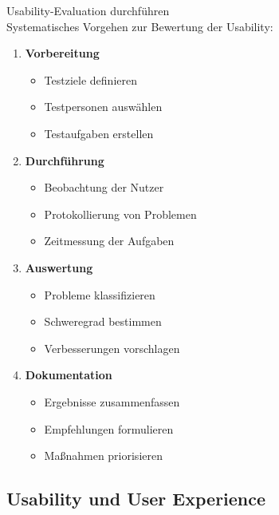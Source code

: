 \begin{KR}{Usability-Evaluation durchführen}\\
Systematisches Vorgehen zur Bewertung der Usability:

\begin{enumerate}
    \item \textbf{Vorbereitung}
    \begin{itemize}
        \item Testziele definieren
        \item Testpersonen auswählen
        \item Testaufgaben erstellen
    \end{itemize}
    
    \item \textbf{Durchführung}
    \begin{itemize}
        \item Beobachtung der Nutzer
        \item Protokollierung von Problemen
        \item Zeitmessung der Aufgaben
    \end{itemize}
    
    \item \textbf{Auswertung}
    \begin{itemize}
        \item Probleme klassifizieren
        \item Schweregrad bestimmen
        \item Verbesserungen vorschlagen
    \end{itemize}
    
    \item \textbf{Dokumentation}
    \begin{itemize}
        \item Ergebnisse zusammenfassen
        \item Empfehlungen formulieren
        \item Maßnahmen priorisieren
    \end{itemize}
\end{enumerate}
\end{KR}

\subsection{Usability und User Experience}

